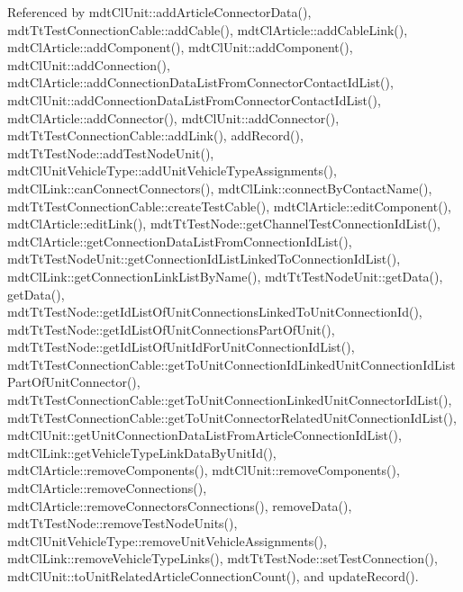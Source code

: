 Referenced by mdt\-Cl\-Unit\-::add\-Article\-Connector\-Data(), mdt\-Tt\-Test\-Connection\-Cable\-::add\-Cable(), mdt\-Cl\-Article\-::add\-Cable\-Link(), mdt\-Cl\-Article\-::add\-Component(), mdt\-Cl\-Unit\-::add\-Component(), mdt\-Cl\-Unit\-::add\-Connection(), mdt\-Cl\-Article\-::add\-Connection\-Data\-List\-From\-Connector\-Contact\-Id\-List(), mdt\-Cl\-Unit\-::add\-Connection\-Data\-List\-From\-Connector\-Contact\-Id\-List(), mdt\-Cl\-Article\-::add\-Connector(), mdt\-Cl\-Unit\-::add\-Connector(), mdt\-Tt\-Test\-Connection\-Cable\-::add\-Link(), add\-Record(), mdt\-Tt\-Test\-Node\-::add\-Test\-Node\-Unit(), mdt\-Cl\-Unit\-Vehicle\-Type\-::add\-Unit\-Vehicle\-Type\-Assignments(), mdt\-Cl\-Link\-::can\-Connect\-Connectors(), mdt\-Cl\-Link\-::connect\-By\-Contact\-Name(), mdt\-Tt\-Test\-Connection\-Cable\-::create\-Test\-Cable(), mdt\-Cl\-Article\-::edit\-Component(), mdt\-Cl\-Article\-::edit\-Link(), mdt\-Tt\-Test\-Node\-::get\-Channel\-Test\-Connection\-Id\-List(), mdt\-Cl\-Article\-::get\-Connection\-Data\-List\-From\-Connection\-Id\-List(), mdt\-Tt\-Test\-Node\-Unit\-::get\-Connection\-Id\-List\-Linked\-To\-Connection\-Id\-List(), mdt\-Cl\-Link\-::get\-Connection\-Link\-List\-By\-Name(), mdt\-Tt\-Test\-Node\-Unit\-::get\-Data(), get\-Data(), mdt\-Tt\-Test\-Node\-::get\-Id\-List\-Of\-Unit\-Connections\-Linked\-To\-Unit\-Connection\-Id(), mdt\-Tt\-Test\-Node\-::get\-Id\-List\-Of\-Unit\-Connections\-Part\-Of\-Unit(), mdt\-Tt\-Test\-Node\-::get\-Id\-List\-Of\-Unit\-Id\-For\-Unit\-Connection\-Id\-List(), mdt\-Tt\-Test\-Connection\-Cable\-::get\-To\-Unit\-Connection\-Id\-Linked\-Unit\-Connection\-Id\-List\-Part\-Of\-Unit\-Connector(), mdt\-Tt\-Test\-Connection\-Cable\-::get\-To\-Unit\-Connection\-Linked\-Unit\-Connector\-Id\-List(), mdt\-Tt\-Test\-Connection\-Cable\-::get\-To\-Unit\-Connector\-Related\-Unit\-Connection\-Id\-List(), mdt\-Cl\-Unit\-::get\-Unit\-Connection\-Data\-List\-From\-Article\-Connection\-Id\-List(), mdt\-Cl\-Link\-::get\-Vehicle\-Type\-Link\-Data\-By\-Unit\-Id(), mdt\-Cl\-Article\-::remove\-Components(), mdt\-Cl\-Unit\-::remove\-Components(), mdt\-Cl\-Article\-::remove\-Connections(), mdt\-Cl\-Article\-::remove\-Connectors\-Connections(), remove\-Data(), mdt\-Tt\-Test\-Node\-::remove\-Test\-Node\-Units(), mdt\-Cl\-Unit\-Vehicle\-Type\-::remove\-Unit\-Vehicle\-Assignments(), mdt\-Cl\-Link\-::remove\-Vehicle\-Type\-Links(), mdt\-Tt\-Test\-Node\-::set\-Test\-Connection(), mdt\-Cl\-Unit\-::to\-Unit\-Related\-Article\-Connection\-Count(), and update\-Record().

